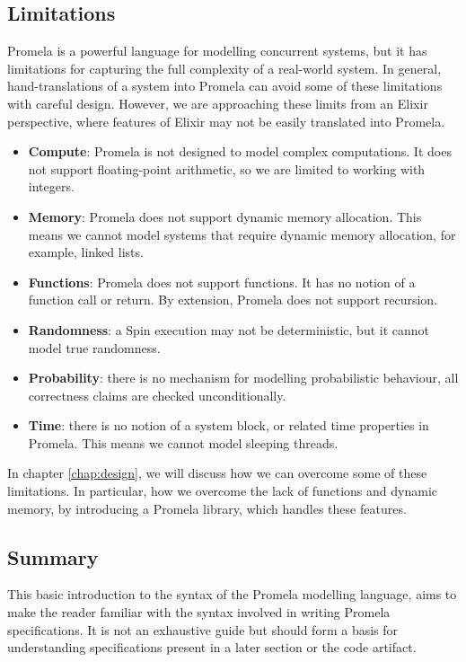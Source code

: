 \subsection{Limitations} \label{sec:promela_limitations}
Promela is a powerful language for modelling concurrent systems, but it has limitations for capturing the full complexity of a real-world system. In general, hand-translations of a system into Promela can avoid some of these limitations with careful design. However, we are approaching these limits from an Elixir perspective, where features of Elixir may not be easily translated into Promela.
\begin{itemize}
    \item \textbf{Compute}: Promela is not designed to model complex computations. It does not support floating-point arithmetic, so we are limited to working with integers.
    \item \textbf{Memory}: Promela does not support dynamic memory allocation. This means we cannot model systems that require dynamic memory allocation, for example, linked lists.
    \item \textbf{Functions}: Promela does not support functions. It has no notion of a function call or return. By extension, Promela does not support recursion.
    \item \textbf{Randomness}: a Spin execution may not be deterministic, but it cannot model true randomness.
    \item \textbf{Probability}: there is no mechanism for modelling probabilistic behaviour, all correctness claims are checked unconditionally.
    \item \textbf{Time}: there is no notion of a system block, or related time properties in Promela. This means we cannot model sleeping threads.
\end{itemize}
In chapter \ref{chap:design}, we will discuss how we can overcome some of these limitations. In particular, how we overcome the lack of functions and dynamic memory, by introducing a Promela library, which handles these features.
\subsection{Summary}
This basic introduction to the syntax of the Promela modelling language, aims to make the reader familiar with the syntax involved in writing Promela specifications. It is not an exhaustive guide but should form a basis for understanding specifications present in a later section or the code artifact.

